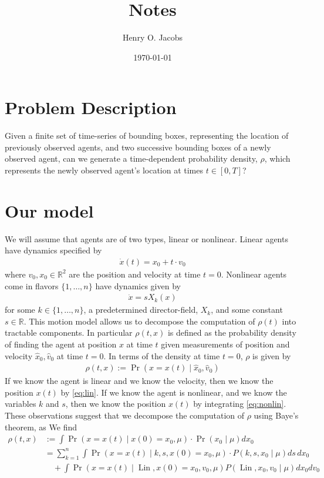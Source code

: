 \documentclass[12pt]{amsart}
\title{Notes}
\author{Henry O. Jacobs}
\date{\today}
\DeclareMathOperator{\Lin}{Lin}
\begin{document}
\maketitle

\section{Problem Description}
Given a finite set of time-series of bounding boxes, representing the location of previously observed agents, and
two successive bounding boxes of a newly observed agent, can we generate a time-dependent probability density, $\rho$, which represents the
newly observed agent's location at times $t \in [0, T]$?

\section{Our model}
We will assume that agents are of two types, linear or nonlinear.  Linear agents have dynamics specified by
\begin{align}
	\dot{x} (t)= x_0 + t \cdot v_0 \label{eq:lin}
\end{align}
where $v_0, x_0 \in \mathbb{R}^2$ are the position and velocity at time $t=0$.
Nonlinear agents come in flavors $\{1,\dots,n\}$ have dynamics given by
\begin{align}
	\dot{x} = s X_k(x) \label{eq:nonlin}
\end{align}
for some $k \in \{1,\dots,n\}$, a predetermined director-field, $X_k$, and some constant $s \in \mathbb{R}$.
This motion model allows us to decompose the computation of $\rho(t)$ into tractable components.
In particular $\rho(t,x)$ is defined as the probability density of finding the agent at position $x$ at time $t$ given measurements of position and velocity $\hat{x}_0, \hat{v}_0$ at time $t=0$.
In terms of the density at time $t=0$, $\rho$ is given by
\begin{align*}
	\rho(t,x ) := \Pr( x = x(t)\mid \hat{x}_0, \hat{v}_0 )
\end{align*}
If we know the agent is linear and we know the velocity, then we know the position $x(t)$ by \eqref{eq:lin}.
If we know the agent is nonlinear, and we know the variables $k$ and $s$, then we know the position $x(t)$ by integrating \eqref{eq:nonlin}.
These observations suggest that we decompose the computation of $\rho$ using Baye's theorem, as
We find
\begin{align*}
	\rho(t,x ) &:= \int \Pr( x = x(t) \mid x(0) = x_0, \mu ) \cdot \Pr(x_0 \mid \mu ) dx_0 \\
	&= \sum_{k=1}^{n} \int \Pr( x = x(t) \mid k,s, x(0) = x_0, \mu ) \cdot P( k,s,x_0 \mid \mu) ds \, dx_0 \\
	&\quad + \int \Pr(x = x(t) \mid \Lin, x(0) = x_0, v_0 , \mu ) P( \Lin, x_0, v_0  \mid \mu ) dx_0 dv_0
\end{align*}
\end{document}
